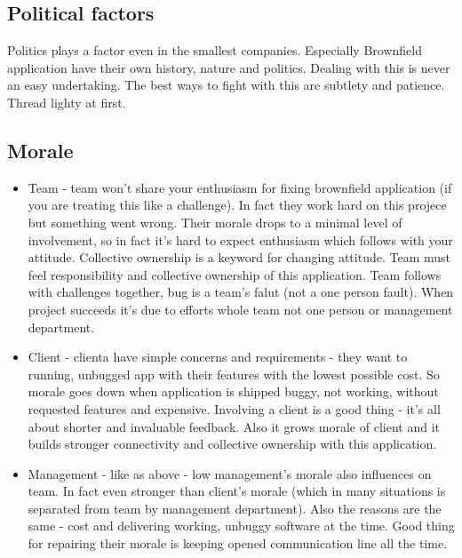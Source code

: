 \documentclass[11pt,a4paper]{article}
\begin{document}
\subsection{Political factors}
Politics plays a factor even in the smallest companies. Especially Brownfield application have their own history, nature and politics. Dealing with this is never an easy undertaking. The best ways to fight with this are subtlety and patience. Thread lighty at first.

\subsection{Morale}
\begin{itemize}
	\item Team - team won't share your enthusiasm for fixing brownfield application (if you are treating this like a challenge). In fact they work hard on this projece but something went wrong. Their morale drops to a minimal level of involvement, so in fact it's hard to expect enthusiasm which follows with your attitude. Collective ownership is a keyword for changing attitude. Team must feel responsibility and collective ownership of this application. Team follows with challenges together, bug is a team's falut (not a one person fault). When project succeeds it's due to efforts whole team not one person or management department.
	\item Client - clienta have simple concerns and requirements - they want to running, unbugged app with their features with the lowest possible cost. So morale goes down when application is shipped buggy, not working, without requested features and expensive. Involving a client is a good thing - it's all about shorter and invaluable feedback. Also it grows morale of client and it builds stronger connectivity and collective ownership with this application.
	\item Management - like as above - low management's morale also influences on team. In fact even stronger than client's morale (which in many situations is separated from team by management department). Also the reasons are the same - cost and delivering working, unbuggy software at the time. Good thing for repairing their morale is keeping opened communication line all the time.
\end{itemize}
\end{document}
